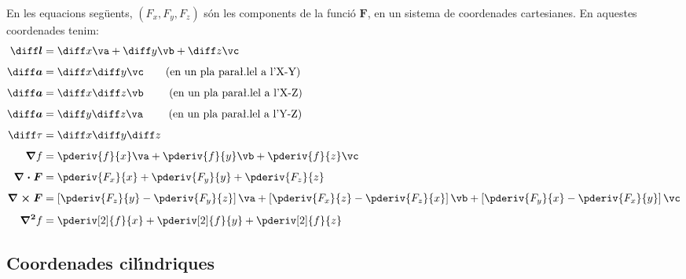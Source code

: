 \documentclass[catalan,a4paper,twoside,11pt]{article}
\begin{document}
En les equacions seg\"{u}ents, $(F_x,F_y,F_z)$  s\'{o}n les
components de la funci\'{o}  $\boldsymbol{F}$, en un sistema de
coordenades cartesianes. En aquestes coordenades tenim:
\begin{align}
    \boldsymbol{\diff l} &= \diff x \va + \diff y \vb + \diff z \vc\\[1ex]
    \boldsymbol{\diff a} &= \diff x \diff y \vc \qquad\text{(en un pla
    para{\l.l}el a l'X-Y)}\\[1ex]
    \boldsymbol{\diff a} &= \diff x \diff z \vb \qquad\text{ (en un pla
    para{\l.l}el a l'X-Z)}\\[1ex]
    \boldsymbol{\diff a} &= \diff y \diff z \va \qquad\text{ (en un pla
    para{\l.l}el a l'Y-Z)}\\[1ex]
    \diff\tau &= \diff x \diff y \diff z\\[1ex]
    \boldsymbol{\nabla}f &= \pderiv{f}{x}\va + \pderiv{f}{y}\vb
    + \pderiv{f}{z}\vc\\[1ex]
    \boldsymbol{\nabla\cdot F} &= \pderiv{F_x}{x} + \pderiv{F_y}{y}
    + \pderiv{F_z}{z}\\[1ex]
    \boldsymbol{\nabla\times F} &= \left[\pderiv{F_z}{y}-\pderiv{F_y}{z}\right]\va +
    \left[\pderiv{F_x}{z}-\pderiv{F_z}{x}\right]\vb +
    \left[\pderiv{F_y}{x}-\pderiv{F_x}{y}\right]\vc\\[1ex]
    \boldsymbol{\nabla^2}f &= \pderiv[2]{f}{x} + \pderiv[2]{f}{y}+ \pderiv[2]{f}{z}
\end{align}

\subsection{Coordenades cil\'{\i}ndriques}
\end{document}
